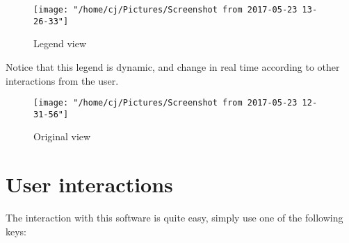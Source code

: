 \documentclass{article}
\begin{document}
\begin{figure}[H]
  \centering
  \texttt{[image: "/home/cj/Pictures/Screenshot from 2017-05-23 13-26-33"]}
  \caption{Legend view}
\end{figure}

Notice that this legend is dynamic, and change in real time according to other interactions from the user.

\begin{figure}[H]
  \centering
  \texttt{[image: "/home/cj/Pictures/Screenshot from 2017-05-23 12-31-56"]}
  \caption{Original view}
  \label{}
\end{figure}
\section{User interactions}
The interaction with this software is quite easy, simply use one of the following keys:
\end{document}
